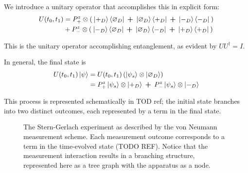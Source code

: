 We introduce a unitary operator that accomplishes this in explicit form:
\begin{align}
  U(t_0, t_1) &= P^z_+ \otimes \left(\: \ket{+_D}\bra{\varnothing_D} \: \bm{+} \: \ket{\varnothing_D}\bra{+_D} \: \bm{+} \: \ket{-_D}\bra{-_D} \: \right) \\ \nonumber
  &+ P^z_- \otimes \left( \: \ket{-_D}\bra{\varnothing_D} \: \bm{+} \: \ket{\varnothing_D}\bra{-_D} \: \bm{+} \: \ket{+_D}\bra{+_D} \: \right)
\end{align}

This is the unitary operator accomplishing entanglement, as evident by $UU^\dagger = I$.

In general, the final state is
\begin{align}
  U(t_0, t_1)\ket{\psi} & =  U(t_0, t_1) \left(\ket{\psi_s} \otimes \ket{\varnothing_D} \right) \\
  &= \nonumber P^z_+ \ket{\psi_s} \otimes \ket{+_D} \: \bm{+} \: P^z_- \ket{\psi_s} \otimes \ket{-_D}
\end{align}

This process is represented schematically in TOD ref; the initial state branches into two distinct outcomes, each represented by a term in the final state.

\begin{figure}
\centering\CaptionFontSize
{}

\caption[Insert an abbreviated caption here to show in the List of Figures]
{The Stern-Gerlach experiment as described by the von Neumann measurement scheme. Each measurement outcome corresponds to a term in the time-evolved state (TODO REF). Notice that the measurement interaction results in a branching structure, represented here as a tree graph with the apparatus as a node.}
\label{Figure:Measurement:DetectorStates}
\end{figure}

